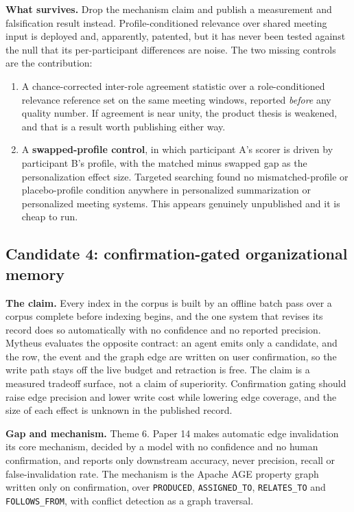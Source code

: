 \textbf{What survives.} Drop the mechanism claim and publish a measurement and
falsification result instead. Profile-conditioned relevance over shared meeting
input is deployed and, apparently, patented, but it has never been tested
against the null that its per-participant differences are noise. The two
missing controls are the contribution:

\begin{enumerate}
\item A chance-corrected inter-role agreement statistic over a role-conditioned
relevance reference set on the same meeting windows, reported \emph{before} any
quality number. If agreement is near unity, the product thesis is weakened, and
that is a result worth publishing either way.
\item A \textbf{swapped-profile control}, in which participant A's scorer is
driven by participant B's profile, with the matched minus swapped gap as the
personalization effect size. Targeted searching found no mismatched-profile or
placebo-profile condition anywhere in personalized summarization or personalized
meeting systems. This appears genuinely unpublished and it is cheap to run.
\end{enumerate}

\subsection{Candidate 4: confirmation-gated organizational memory}

\textbf{The claim.} Every index in the corpus is built by an offline batch pass
over a corpus complete before indexing begins, and the one system that revises
its record does so automatically with no confidence and no reported precision.
Mytheus evaluates the opposite contract: an agent emits only a candidate, and
the row, the event and the graph edge are written on user confirmation, so the
write path stays off the live budget and retraction is free. The claim is a
measured tradeoff surface, not a claim of superiority. Confirmation gating
should raise edge precision and lower write cost while lowering edge coverage,
and the size of each effect is unknown in the published record.

\textbf{Gap and mechanism.} Theme 6. Paper 14 makes automatic edge invalidation
its core mechanism, decided by a model with no confidence and no human
confirmation, and reports only downstream accuracy, never precision, recall or
false-invalidation rate. The mechanism is the Apache AGE property graph written
only on confirmation, over \texttt{PRODUCED}, \texttt{ASSIGNED\_TO},
\texttt{RELATES\_TO} and \texttt{FOLLOWS\_FROM}, with conflict detection as a
graph traversal.

